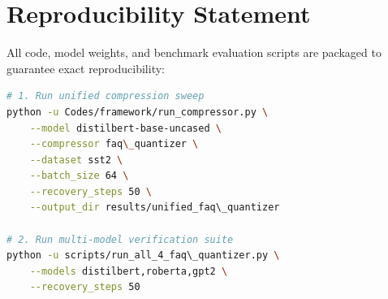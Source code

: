 \section{Reproducibility Statement}
All code, model weights, and benchmark evaluation scripts are packaged to guarantee exact reproducibility:
\begin{lstlisting}[language=bash]
# 1. Run unified compression sweep
python -u Codes/framework/run_compressor.py \
    --model distilbert-base-uncased \
    --compressor faq\_quantizer \
    --dataset sst2 \
    --batch_size 64 \
    --recovery_steps 50 \
    --output_dir results/unified_faq\_quantizer

# 2. Run multi-model verification suite
python -u scripts/run_all_4_faq\_quantizer.py \
    --models distilbert,roberta,gpt2 \
    --recovery_steps 50
\end{lstlisting}
